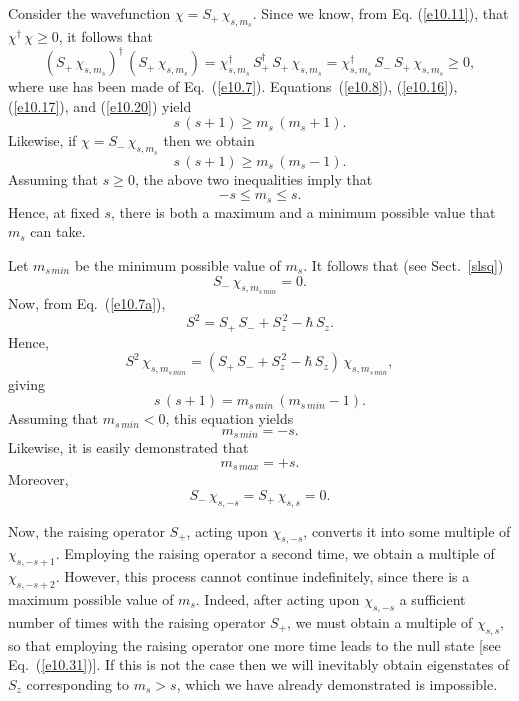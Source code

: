 Consider the wavefunction $\chi=S_+\,\chi_{s,m_s}$. Since we know,
from Eq. (\ref{e10.11}), that $\chi^\dag\,\chi\geq 0$, it follows that
\begin{equation}
(S_+\,\chi_{s,m_s})^\dag\,(S_+\,\chi_{s,m_s}) = \chi_{s,m_s}^\dag\,
S_+^\dag\,S_+\,\chi_{s,m_s} = \chi_{s,m_s}^\dag\,S_-\,S_+\,\chi_{s,m_s}\geq 0,
\end{equation}
where use has been made of Eq.~(\ref{e10.7}). Equations~(\ref{e10.8}), (\ref{e10.16}), (\ref{e10.17}), and (\ref{e10.20})
yield
\begin{equation}
s\,(s+1) \geq m_s\,(m_s+1).
\end{equation}
Likewise, if $\chi=S_-\,\chi_{s,m_s}$ then we obtain
\begin{equation}
s\,(s+1)\geq m_s\,(m_s-1).
\end{equation}
Assuming that $s\geq 0$, the above two inequalities
imply that
\begin{equation}
-s \leq m_s\leq s.
\end{equation}
Hence, at fixed $s$, there is both a maximum and a minimum possible value that $m_s$
can take.

Let $m_{s\,min}$ be the minimum possible value of $m_s$. It follows
that (see Sect.~\ref{slsq})
\begin{equation}
S_-\,\chi_{s,m_{s\,min}}= 0.
\end{equation}
Now, from Eq.~(\ref{e10.7a}), 
\begin{equation}
S^2 = S_+\,S_-+S_z^{\,2}-\hbar\,S_z.
\end{equation}
Hence,
\begin{equation}
S^2\,\chi_{s,m_{s\,min}} = (S_+\,S_- +S_z^{\,2}-\hbar\,S_z)\,\chi_{s,m_{s\,min}},
\end{equation}
giving
\begin{equation}
s\,(s+1) = m_{s\,min}\,(m_{s\,min}-1).
\end{equation}
Assuming that $m_{s\,min}<0$, this equation yields
\begin{equation}
m_{s\,min} = -s.
\end{equation}
Likewise, it is easily demonstrated that
\begin{equation}
m_{s\,max} = +s.
\end{equation}
Moreover,
\begin{equation}\label{e10.31}
S_-\,\chi_{s,-s} = S_+\,\chi_{s,s} = 0.
\end{equation}

Now, the raising operator $S_+$, acting upon $\chi_{s,-s}$, converts
it into some multiple of $\chi_{s,-s+1}$. Employing the raising operator
a second time, we obtain a multiple of $\chi_{s,-s+2}$. However, this
process cannot continue indefinitely, since there is a maximum possible
value of $m_s$. Indeed, after acting upon $\chi_{s,-s}$ a sufficient number
of times with the raising operator $S_+$, we must obtain a multiple
of $\chi_{s,s}$, so that employing the raising operator one more time
leads to the null state [see Eq.~(\ref{e10.31})]. If this is not the case then we will inevitably obtain eigenstates
of $S_z$ corresponding to $m_s>s$, which we have already demonstrated is impossible.

